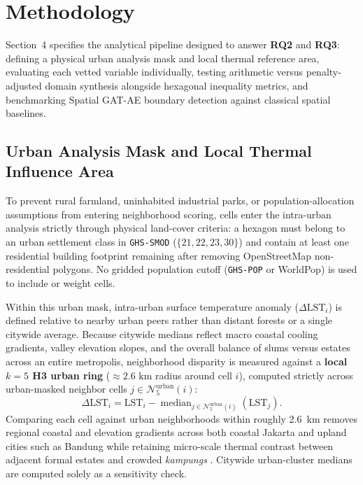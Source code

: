 \section{Methodology}

Section~4 specifies the analytical pipeline designed to answer \textbf{RQ2} and \textbf{RQ3}: defining a physical urban analysis mask and local thermal reference area, evaluating each vetted variable individually, testing arithmetic versus penalty-adjusted domain synthesis alongside hexagonal inequality metrics, and benchmarking Spatial GAT-AE boundary detection against classical spatial baselines.

\subsection{Urban Analysis Mask and Local Thermal Influence Area}
To prevent rural farmland, uninhabited industrial parks, or population-allocation assumptions from entering neighborhood scoring, cells enter the intra-urban analysis strictly through physical land-cover criteria: a hexagon must belong to an urban settlement class in \texttt{GHS-SMOD} ($\{21, 22, 23, 30\}$) and contain at least one residential building footprint remaining after removing OpenStreetMap non-residential polygons. No gridded population cutoff (\texttt{GHS-POP} or WorldPop) is used to include or weight cells.

Within this urban mask, intra-urban surface temperature anomaly ($\Delta\text{LST}_i$) is defined relative to nearby urban peers rather than distant forests or a single citywide average. Because citywide medians reflect macro coastal cooling gradients, valley elevation slopes, and the overall balance of slums versus estates across an entire metropolis, neighborhood disparity is measured against a \textbf{local $k=5$ H3 urban ring} ($\approx 2.6\text{ km}$ radius around cell $i$), computed strictly across urban-masked neighbor cells $j \in \mathcal{N}_5^{\text{urban}}(i)$:
\begin{equation}
    \Delta\text{LST}_i = \text{LST}_i - \operatorname{median}_{j \in \mathcal{N}_5^{\text{urban}}(i)} \left(\text{LST}_j\right).
\end{equation}
Comparing each cell against urban neighborhoods within roughly 2.6~km removes regional coastal and elevation gradients across both coastal Jakarta and upland cities such as Bandung while retaining micro-scale thermal contrast between adjacent formal estates and crowded \textit{kampungs} \citep{Stewart2012}. Citywide urban-cluster medians \citep{Chakraborty2019a, Hsu2021} are computed solely as a sensitivity check.

